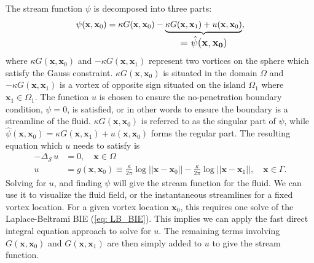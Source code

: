 \documentclass{sfuthesis}
\begin{document}
The stream function $\psi$ is decomposed into three parts: 
\begin{align*}
	\psi(\mathbf{x}, {\mathbf{x}}_0)=\kappa G(\mathbf{x}, {\mathbf{x}}_0)-\underbrace{\kappa G(\mathbf{x}, {\mathbf{x}}_1)+u(\mathbf{x}, {\mathbf{x}}_0)}_{\text{\large $={\hat{\psi}(\mathbf{x},\mathbf{x_0})}$}},
 \end{align*}
 where $\kappa G(\mathbf{x},\mathbf{x}_0)$ and $-\kappa G(\mathbf{x}, \mathbf{x}_1)$ represent two vortices on the sphere which satisfy the Gauss constraint. $\kappa G(\mathbf{x}, \mathbf{x}_0)$ is situated in the domain $\Omega$ and $-\kappa G(\mathbf{x}, \mathbf{x}_1)$ is a vortex of opposite sign situated on the island $\Omega_1$ where $\mathbf{x}_1 \in \Omega_1$. The function $u$ is chosen to ensure the no-penetration boundary condition, $\psi=0$, is satisfied, or in other words to ensure the boundary is a streamline of the fluid. $\kappa G(\mathbf{x}, \mathbf{x}_0)$ is referred to as the singular part of $\psi$, while $\hat{\psi}(\mathbf{x}, \mathbf{x}_0)=\kappa G(\mathbf{x}, \mathbf{x}_1)+u(\mathbf{x}, \mathbf{x}_0)$ forms the regular part. The resulting equation which $u$ needs to satisfy is
\begin{align}
	-{\Delta}_{\mathcal{S} \ } u &=0, \quad \mathbf{x} \in \Omega \label{eq: PointVortexDirLapBelt} \\ 
 	u&=g(\mathbf{x},\mathbf{x}_0) \equiv \frac{\kappa}{2\pi}\log||\mathbf{x}-{\mathbf{x}}_0||-\frac{\kappa}{2\pi}\log||\mathbf{x}-{\mathbf{x}_1||},  \quad \mathbf{x} \in \Gamma. \nonumber
\end{align}
Solving for $u$, and finding $\psi$ will give the stream function for the fluid. We can use it to visualize the fluid field, or the instantaneous streamlines for a fixed vortex location.  For a given vortex location $\mathbf{x}_0$, this requires one solve of the Laplace-Beltrami BIE (\ref{eq: LB_BIE}). This implies we can apply the fast direct integral equation approach to solve for $u$. The remaining terms involving $G(\mathbf{x}, \mathbf{x}_0)$ and $G(\mathbf{x}, \mathbf{x}_1)$ are then simply added to $u$ to give the stream function. 

\end{document}
